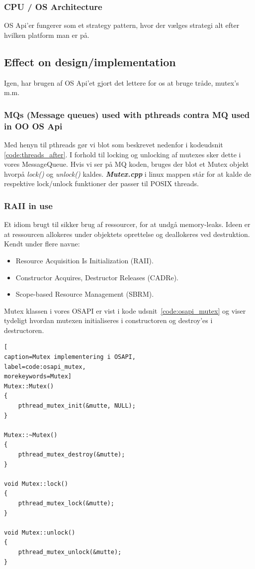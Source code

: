 \subsubsection{CPU / OS Architecture}

OS Api'er fungerer som et strategy pattern, hvor der vælges strategi alt efter hvilken platform man er på.

\subsection{Effect on design/implementation}

Igen, har brugen af OS Api'et gjort det lettere for os at bruge tråde, mutex's m.m.

\subsubsection{MQs (Message queues) used with pthreads contra MQ used in OO OS Api}
Med henyn til pthreads gør vi blot som beskrevet nedenfor i kodeudsnit \ref{code:threads_after}. I forhold til locking og unlocking af mutexes sker dette i vores MessageQueue. Hvis vi ser på MQ koden, bruges der blot et Mutex objekt hvorpå \textit{lock()} og \textit{unlock()} kaldes. \textbf{\textit{Mutex.cpp}} i linux mappen står for at kalde de respektive lock/unlock funktioner der passer til POSIX threads.

\subsubsection{RAII in use}
Et idiom brugt til sikker brug af ressourcer, for at undgå memory-leaks. Ideen er at ressourcen allokeres under objektets oprettelse og deallokeres ved destruktion.\\

Kendt under flere navne: 
\begin{itemize}
	\item Resource Acquisition Is Initialization (RAII).
	\item Constructor Acquires, Destructor Releases (CADRe).
	\item Scope-based Resource Management (SBRM).
\end{itemize}

Mutex klassen i vores OSAPI er vist i kode udsnit~\ref{code:osapi_mutex} og viser tydeligt hvordan mutexen initialiseres i constructoren og destroy'es i destructoren.

\begin{lstlisting}[
caption=Mutex implementering i OSAPI,
label=code:osapi_mutex, 
morekeywords=Mutex]
Mutex::Mutex()
{ 
	pthread_mutex_init(&mutte, NULL);
}

Mutex::~Mutex()
{
	pthread_mutex_destroy(&mutte);
}

void Mutex::lock()
{
	pthread_mutex_lock(&mutte);
}

void Mutex::unlock()
{
	pthread_mutex_unlock(&mutte);
}
\end{lstlisting}

